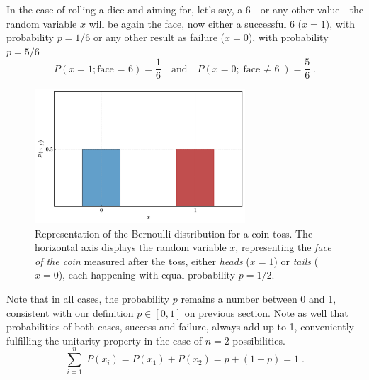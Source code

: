 \documentclass{book}
\begin{document}
In the case of rolling a dice and aiming for, let's say, a 6 - or any other value - the random variable $x$ will be again the face, now either a successful 6 ($x = 1$), with probability $p = 1/6$ or any other result as failure ($x = 0$), with probability $p = 5/6$
\begin{equation}
	P(x = 1; \text{face = 6}) = \frac{1}{6} \quad \text{and} \quad P(x = 0; \text{face $\neq$ 6}) = \frac{5}{6} \; .
	\label{eq:bernoulli_2}
\end{equation}

\begin{figure}[ht]
    \centering
    \includegraphics[width=0.7\textwidth]{figures/chapter2/bernoulli_1.png}
    \caption{Representation of the Bernoulli distribution for a coin toss. The horizontal axis displays the random variable $x$, representing the \textit{face of the coin} measured after the toss, either \textit{heads} ($x = 1$) or \textit{tails} ($x = 0$), each happening with equal probability $p = 1/2$.}
    \label{fig:bernoulli_1}
\end{figure}

Note that in all cases, the probability $p$ remains a number between 0 and 1, consistent with our definition $p \in [0, 1]$ on previous section. Note as well that probabilities of both cases, success and failure, always add up to 1, conveniently fulfilling the unitarity property in the case of $n = 2$ possibilities.
\begin{equation}
	\sum_{i = 1}^{n} \; P(x_{i}) = P(x_1) + P(x_2) = p + (1 - p) = 1 \; .
\end{equation}
\end{document}
